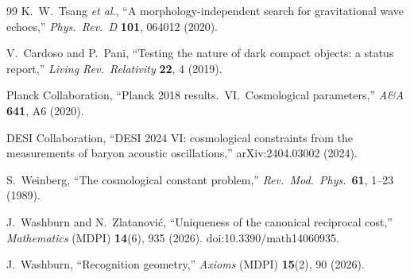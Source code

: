 \documentclass[11pt,letterpaper]{article}
\theoremstyle{definition}
\begin{document}
\begin{thebibliography}{99}
K.~W.~Tsang \emph{et al.}, ``A morphology-independent search for
gravitational wave echoes,'' \emph{Phys.\ Rev.\ D} \textbf{101},
064012 (2020).

V.~Cardoso and P.~Pani, ``Testing the nature of dark compact objects:
a status report,'' \emph{Living Rev.\ Relativity} \textbf{22}, 4
(2019).

Planck Collaboration, ``Planck 2018 results.\ VI.\ Cosmological
parameters,'' \emph{A\&A} \textbf{641}, A6 (2020).

DESI Collaboration, ``DESI 2024 VI: cosmological constraints from the
measurements of baryon acoustic oscillations,'' arXiv:2404.03002
(2024).

S.~Weinberg, ``The cosmological constant problem,''
\emph{Rev.\ Mod.\ Phys.}\ \textbf{61}, 1--23 (1989).

J.~Washburn and N.~Zlatanovi\'c, ``Uniqueness of the canonical
reciprocal cost,'' \emph{Mathematics} (MDPI) \textbf{14}(6), 935
(2026).  doi:10.3390/math14060935.

J.~Washburn, ``Recognition geometry,'' \emph{Axioms} (MDPI)
\textbf{15}(2), 90 (2026).

\end{thebibliography}
\end{document}
